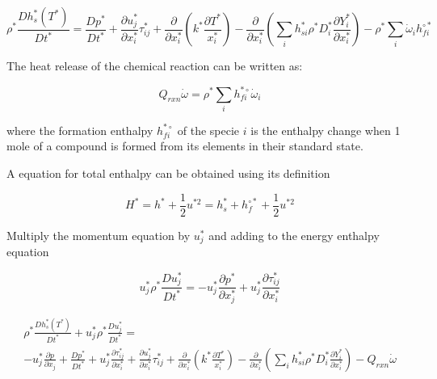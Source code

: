 \begin{equation}
\rho^*
\frac{D h_{s}^*(T^*)}{D t^*}
=
\frac{D p^* }{Dt^*}
+
\frac{\partial u_j^*}{\partial x^*_i}
\tau_{ij}^*
+
\frac{\partial}{\partial x_i^*}
\left(
    k^*\frac{\partial T^*}{x_i^*}
\right)
-
\frac{\partial}{\partial x_i^*}
\left(
        \sum_i
        h_{si}^*
        \rho^*
        D_i^*
        \frac{\partial Y_i^*}{\partial x_i^*}
\right)
-
\rho^*
\sum_i  
\dot{\omega}_i
h_{fi}^{\circ*}
\end{equation} 

The heat release of the chemical reaction  
can be written as: 

\begin{equation} 
    Q_{rxn}
    \dot{\omega}
    =
    \rho^*
    \sum_i h_{fi}^{*\circ}
    \dot{\omega}_i
\end{equation} 

where the formation enthalpy  $h_{fi}^{*\circ}$ 
of the specie $i$ is
the enthalpy change when 1 mole of a compound 
is formed from its elements in their standard state. 

A equation for total enthalpy can be 
obtained using its definition 

\begin{equation} 
    H^{*}
    =h^*+\frac{1}{2}u^{*2}
    =h_s^{*}+h_f^{\circ*}+\frac{1}{2}u^{*2}
\end{equation} 

Multiply the momentum equation by $u_j^{*}$ 
and adding to the energy enthalpy equation 

\begin{equation} 
u_j^*
\rho^*
\frac{D u_j^*}{D t^*}
=
-
u_j^*
\frac{\partial p^*}{\partial x_j^*} 
+
u_j^*
\frac{\partial \tau_{ij}^*}{\partial x_i^*}
\end{equation} 

\begin{equation*}
\begin{split}
\rho^*
\frac{D h_{s}^*(T^*)}{D t^*}
+
u_j^*
\rho^*
\frac{D u_j^*}{D t^*}
=
\\
-
u_j^*
\frac{\partial p}{\partial x_j} 
+
\frac{D p^* }{Dt^*}
+
u_j^*
\frac{\partial \tau_{ij}^*}{\partial x_i^*}
+
\frac{\partial u_j^*}{\partial x^*_i}
\tau_{ij}^*
+
\frac{\partial}{\partial x_i^*}
\left(
    k^*\frac{\partial T^*}{x_i^*}
\right)
-
\frac{\partial}{\partial x_i^*}
\left(
        \sum_i
        h_{si}^*
        \rho^*
        D_i^*
        \frac{\partial Y_i^*}{\partial x_i^*}
\right)
-
Q_{rxn}
\dot{\omega}
\end{split}
\end{equation*} 

